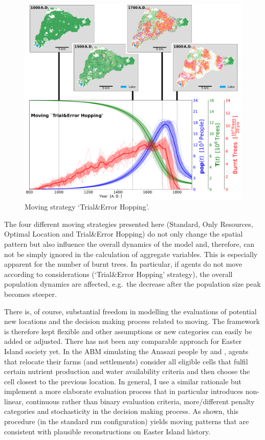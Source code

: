 \begin{figure}
	\centering
	\includegraphics[width=1\textwidth]{images/Results/Moving/alphaHopping_EnsembleStatistics+Panels}
	\caption{Moving strategy `Trial\&Error Hopping'.}
	\label{fig:hop}
\end{figure}
The four different moving strategies presented here (Standard, Only Resources, Optimal Location and Trial\&Error Hopping) do not only change the spatial pattern but also influence the overall dynamics of the model and, therefore, can not be simply ignored in the calculation of aggregate variables. 
This is especially apparent for the number of burnt trees.
In particular, if agents do not move according to considerations (`Trial\&Error Hopping' strategy), the overall population dynamics are affected, e.g.\ the decrease after the population size peak becomes steeper.

There is, of course, substantial freedom in modelling the evaluations of potential new locations and the decision making process related to moving.
The framework is therefore kept flexible and other assumptions or new categories can easily be added or adjusted.
There has not been any comparable approach for Easter Island society yet.
In the ABM simulating the Anasazi people by \citet{Axtell2002} and \citet{Janssen2009}, agents that relocate their farms (and settlements) consider all eligible cells that fulfil certain nutrient production and water availability criteria and then choose the cell closest to the previous location.
In general, I use a similar rationale but implement a more elaborate evaluation process that in particular introduces non-linear, continuous rather than binary evaluation criteria, more/different penalty categories and stochasticity in the decision making process.  
As shown, this procedure (in the standard run configuration) yields moving patterns that are consistent with plausible reconstructions on Easter Island history.



